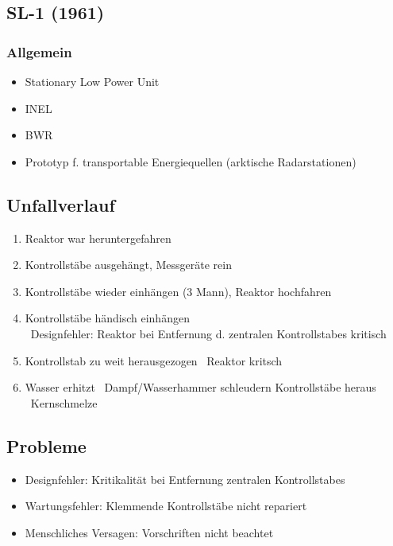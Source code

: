 \documentclass[12pt]{article}
\begin{document}
\subsection{SL-1 (1961)}

\subsubsection{Allgemein}
\begin{itemize}
  \item Stationary Low Power Unit 
  \item INEL
  \item BWR
  \item Prototyp f. transportable Energiequellen (arktische Radarstationen)
\end{itemize}

\subsection{Unfallverlauf}
\begin{enumerate}
  \item Reaktor war heruntergefahren
  \item Kontrollstäbe ausgehängt, Messgeräte rein
  \item Kontrollstäbe wieder einhängen (3 Mann), Reaktor hochfahren
  \item Kontrollstäbe händisch einhängen\\
  \textrightarrow\ Designfehler: Reaktor bei Entfernung d. zentralen Kontrollstabes kritisch
  \item Kontrollstab zu weit herausgezogen \textrightarrow\ Reaktor kritsch
  \item Wasser erhitzt \textrightarrow\ Dampf/Wasserhammer schleudern Kontrollstäbe heraus \textrightarrow\ Kernschmelze
\end{enumerate}

\subsection{Probleme}
\begin{itemize}
  \item Designfehler: Kritikalität bei Entfernung zentralen Kontrollstabes
  \item Wartungsfehler: Klemmende Kontrollstäbe nicht repariert
  \item Menschliches Versagen: Vorschriften nicht beachtet
\end{itemize}
\end{document}
